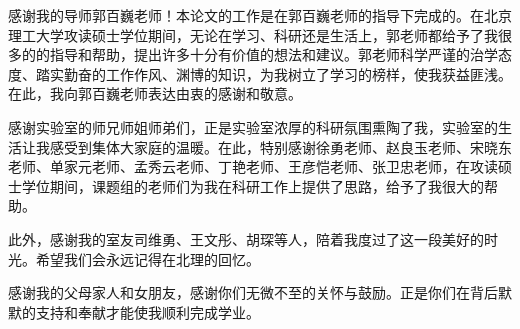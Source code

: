 

\begin{thanks}


感谢我的导师郭百巍老师！本论文的工作是在郭百巍老师的指导下完成的。在北京理工大学攻读硕士学位期间，无论在学习、科研还是生活上，郭老师都给予了我很多的的指导和帮助，提出许多十分有价值的想法和建议。郭老师科学严谨的治学态度、踏实勤奋的工作作风、渊博的知识，为我树立了学习的榜样，使我获益匪浅。在此，我向郭百巍老师表达由衷的感谢和敬意。

感谢实验室的师兄师姐师弟们，正是实验室浓厚的科研氛围熏陶了我，实验室的生活让我感受到集体大家庭的温暖。在此，特别感谢徐勇老师、赵良玉老师、宋晓东老师、单家元老师、孟秀云老师、丁艳老师、王彦恺老师、张卫忠老师，在攻读硕士学位期间，课题组的老师们为我在科研工作上提供了思路，给予了我很大的帮助。

此外，感谢我的室友司维勇、王文彤、胡琛等人，陪着我度过了这一段美好的时光。希望我们会永远记得在北理的回忆。

感谢我的父母家人和女朋友，感谢你们无微不至的关怀与鼓励。正是你们在背后默默的支持和奉献才能使我顺利完成学业。


\end{thanks}
